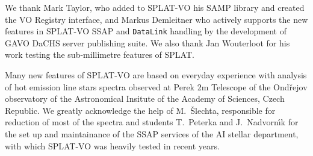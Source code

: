 \documentclass[final,authoryear,5p,times,twocolumn]{elsarticle}
\begin{document}
We thank Mark Taylor, who added to
SPLAT-VO his SAMP library and created the VO Registry interface, and
Markus Demleitner who actively supports the new features in SPLAT-VO SSAP
and \texttt{DataLink} handling by the development of GAVO DaCHS server publishing suite.
We also thank Jan Wouterloot for his work testing the sub-millimetre
features of SPLAT.

Many new features of SPLAT-VO are based on everyday experience with
analysis of hot emission line stars spectra observed at Perek 2m
Telescope of the Ond\v{r}ejov observatory of the Astronomical Insitute
of the Academy of Sciences, Czech Republic. We greatly acknowledge the
help of M.~\v{S}lechta, responsible for reduction of most of the
spectra and students T.~Peterka and J.~Nadvorn\'\i{}k for the set up
and maintainance of the SSAP services of the AI stellar department,
with which SPLAT-VO was heavily tested in recent years.









\end{document}
